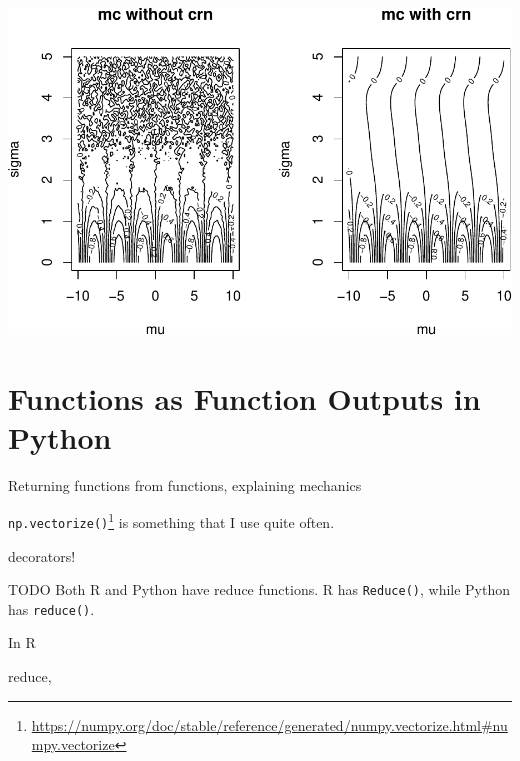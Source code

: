 \documentclass[
  12pt,
]{krantz}
\renewcommand{\href}[2]{#2\footnote{\url{#1}}}
\begin{document}
\includegraphics{r_and_python_book_files/figure-latex/unnamed-chunk-244-1.pdf}

\hypertarget{functions-as-function-outputs-in-python}{%
\section{Functions as Function Outputs in Python}\label{functions-as-function-outputs-in-python}}

Returning functions from functions, explaining mechanics

\href{https://numpy.org/doc/stable/reference/generated/numpy.vectorize.html\#numpy.vectorize}{\texttt{np.vectorize()}} is something that I use quite often.

decorators!

TODO Both R and Python have reduce functions. R has \texttt{Reduce()}, while Python has \texttt{reduce()}.

In R

reduce,

  

\backmatter
\printindex
\end{document}
